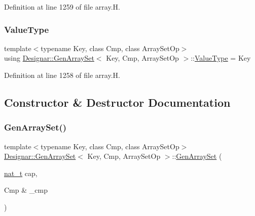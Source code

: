 Definition at line 1259 of file array.\+H.

\mbox{\label{class_designar_1_1_gen_array_set_aef777cbce261e3d5df5f03c632a7c8c2}} 
\subsubsection{\texorpdfstring{Value\+Type}{ValueType}}
{\footnotesize\ttfamily template$<$typename Key, class Cmp, class Array\+Set\+Op$>$ \\
using \hyperlink{class_designar_1_1_gen_array_set}{Designar\+::\+Gen\+Array\+Set}$<$ Key, Cmp, Array\+Set\+Op $>$\+::\hyperlink{class_designar_1_1_gen_array_set_aef777cbce261e3d5df5f03c632a7c8c2}{Value\+Type} =  Key}



Definition at line 1258 of file array.\+H.



\subsection{Constructor \& Destructor Documentation}
\mbox{\label{class_designar_1_1_gen_array_set_a51b519b8c338a8f0e4db3d50e77bfd6f}} 
\subsubsection{\texorpdfstring{Gen\+Array\+Set()}{GenArraySet()}\hspace{0.1cm}{\footnotesize\ttfamily [1/6]}}
{\footnotesize\ttfamily template$<$typename Key, class Cmp, class Array\+Set\+Op$>$ \\
\hyperlink{class_designar_1_1_gen_array_set}{Designar\+::\+Gen\+Array\+Set}$<$ Key, Cmp, Array\+Set\+Op $>$\+::\hyperlink{class_designar_1_1_gen_array_set}{Gen\+Array\+Set} (\begin{DoxyParamCaption}\item[{\hyperlink{namespace_designar_aa72662848b9f4815e7bf31a7cf3e33d1}{nat\+\_\+t}}]{cap,  }\item[{Cmp \&}]{\+\_\+cmp }\end{DoxyParamCaption})\hspace{0.3cm}{\ttfamily [inline]}}



